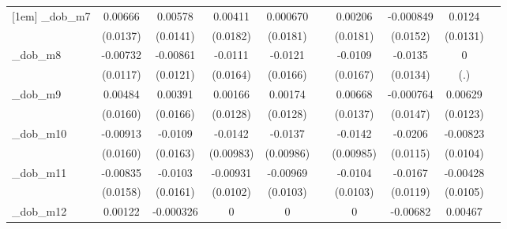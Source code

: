 \begin{table}[htbp]
\begin{tabular}{l*{9}{c}}
[1em]
\_dob\_m7     &     0.00666         &     0.00578         &     0.00411         &    0.000670         &                     &     0.00206         &   -0.000849         &      0.0124         &                     \\
            &    (0.0137)         &    (0.0141)         &    (0.0182)         &    (0.0181)         &                     &    (0.0181)         &    (0.0152)         &    (0.0131)         &                     \\
[1em]
\_dob\_m8     &    -0.00732         &    -0.00861         &     -0.0111         &     -0.0121         &                     &     -0.0109         &     -0.0135         &           0         &                     \\
            &    (0.0117)         &    (0.0121)         &    (0.0164)         &    (0.0166)         &                     &    (0.0167)         &    (0.0134)         &         (.)         &                     \\
[1em]
\_dob\_m9     &     0.00484         &     0.00391         &     0.00166         &     0.00174         &                     &     0.00668         &   -0.000764         &     0.00629         &                     \\
            &    (0.0160)         &    (0.0166)         &    (0.0128)         &    (0.0128)         &                     &    (0.0137)         &    (0.0147)         &    (0.0123)         &                     \\
[1em]
\_dob\_m10    &    -0.00913         &     -0.0109         &     -0.0142         &     -0.0137         &                     &     -0.0142         &     -0.0206\sym{*}  &    -0.00823         &                     \\
            &    (0.0160)         &    (0.0163)         &   (0.00983)         &   (0.00986)         &                     &   (0.00985)         &    (0.0115)         &    (0.0104)         &                     \\
[1em]
\_dob\_m11    &    -0.00835         &     -0.0103         &    -0.00931         &    -0.00969         &                     &     -0.0104         &     -0.0167         &    -0.00428         &                     \\
            &    (0.0158)         &    (0.0161)         &    (0.0102)         &    (0.0103)         &                     &    (0.0103)         &    (0.0119)         &    (0.0105)         &                     \\
[1em]
\_dob\_m12    &     0.00122         &   -0.000326         &           0         &           0         &                     &           0         &    -0.00682         &     0.00467         &                     \\

\end{tabular}
\end{table}
